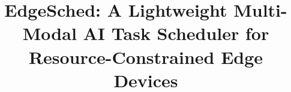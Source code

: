 \documentclass[conference]{IEEEtran}
\begin{document}
\title{EdgeSched: A Lightweight Multi-Modal AI Task Scheduler for Resource-Constrained Edge Devices}

\author{
}

\maketitle


\end{document}

